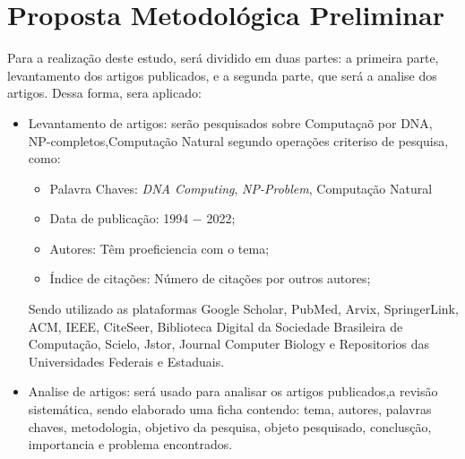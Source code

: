\section*{Proposta Metodológica Preliminar}
    Para a realização deste estudo, será dividido em duas partes: a primeira parte, 
levantamento dos artigos publicados, e a segunda parte, que será a analise dos artigos.
Dessa forma, sera aplicado:
    \begin{itemize}
        \item{Levantamento de artigos:} serão pesquisados sobre Computaçaõ por DNA, NP-completos,Computação Natural
            segundo operações criteriso de pesquisa, como:
            \begin{itemize}
                \item{Palavra Chaves:} \textit{DNA Computing}, \textit{NP-Problem}, Computação Natural
                \item{Data de publicação:} 1994 $-$ 2022;
                \item{Autores:} Têm proeficiencia com o tema;
                \item{Índice de citações:} Número de citações por outros autores;
            \end{itemize}
            Sendo utilizado as plataformas Google Scholar, PubMed, Arvix, SpringerLink,
            ACM, IEEE, CiteSeer, Biblioteca Digital da Sociedade Brasileira de Computação,
            Scielo, Jstor, Journal Computer Biology e Repositorios das Universidades Federais e Estaduais.
        \item{Analise de artigos:} será usado para analisar os artigos publicados,a revisão sistemática, sendo elaborado uma ficha contendo: tema, autores, palavras chaves, metodologia, objetivo da
        pesquisa, objeto pesquisado, conclusção, importancia e problema encontrados.
    \end{itemize}